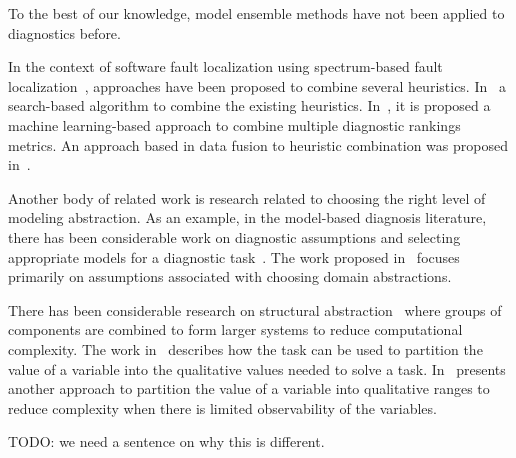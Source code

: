 To the best of our knowledge, model ensemble methods have not been applied to
diagnostics before.

In the context of software fault localization using spectrum-based fault
localization~\citep{abreu2007accuracy}, approaches have been proposed to combine
several heuristics. In~\citep{wang2011search} a search-based algorithm to combine
the existing heuristics. In~\citep{xuan2014learning}, it is proposed a machine
learning-based approach to combine multiple diagnostic rankings metrics. An approach
based in data fusion to heuristic combination was proposed in~\citep{lo2014fusion}.

Another body of related work is research related to choosing the right level of
modeling abstraction. As an example, in the model-based diagnosis literature,
there has been considerable work on diagnostic assumptions and selecting appropriate
models for a diagnostic task~\citep{struss1992s}. The work proposed in~\citep{de2007dynamic}
focuses primarily on assumptions associated with choosing domain abstractions.

There has been considerable research on structural abstraction~\citep{chittaro2004hierarchical,hamscher1990xde}
where groups of components are combined to form larger systems to reduce computational
complexity. The work in~\citep{sachenbacher2005task} describes how the task can be
used to partition the value of a variable into the qualitative values needed to solve a
task. In~\citep{torta2003automatic} presents another
approach to partition the value of a variable into qualitative ranges to reduce
complexity when there is limited observability of the variables.

TODO: we need a sentence on why this is different.
